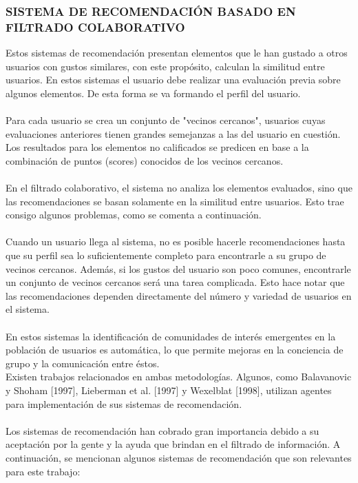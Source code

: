 \documentclass[11pt,a4paper]{article}
\begin{document}
		 \subsubsection{SISTEMA DE RECOMENDACIÓN BASADO EN FILTRADO COLABORATIVO 
		 } 
		 Estos sistemas de recomendación presentan elementos que le han gustado a otros usuarios con gustos similares, con este propósito, calculan la similitud entre usuarios. En estos sistemas el usuario debe realizar una evaluación previa sobre algunos elementos. De esta forma se va formando el perfil del usuario.\\
		 \\
		 Para cada usuario se crea un conjunto de "vecinos cercanos", usuarios cuyas evaluaciones anteriores tienen grandes semejanzas a las del usuario en cuestión. Los resultados para los elementos no calificados se predicen en base a la combinación de puntos (scores) conocidos de los vecinos cercanos.\\
		 \\
		 En el filtrado colaborativo, el sistema no analiza los elementos evaluados, sino que las recomendaciones se basan solamente en la similitud entre usuarios. Esto trae consigo algunos problemas, como se comenta a continuación.\\
		 \\
		 Cuando un usuario llega al sistema, no es posible hacerle recomendaciones hasta que su perfil sea lo suficientemente completo para encontrarle a su grupo de vecinos cercanos. Además, si los gustos del usuario son poco comunes, encontrarle un conjunto de vecinos cercanos será una tarea complicada. Esto hace notar que las recomendaciones dependen directamente del número y variedad de usuarios en el sistema.\\
		 \\
		 En estos sistemas la identificación de comunidades de interés emergentes en la población de usuarios es automática, lo que permite mejoras en la conciencia de grupo y la comunicación entre éstos.\cite{nro2:Online} %
		 \\
		 
		 Existen trabajos relacionados en ambas metodologías. Algunos, como Balavanovic y Shoham [1997], Lieberman et al. [1997] y Wexelblat [1998], utilizan agentes para implementación de sus sistemas de recomendación.\\
		\\
		 Los sistemas de recomendación han cobrado gran importancia debido a su aceptación por la gente y la ayuda que brindan en el filtrado de información. A continuación, se mencionan algunos sistemas de recomendación que son relevantes para este trabajo:
		 
\end{document}
